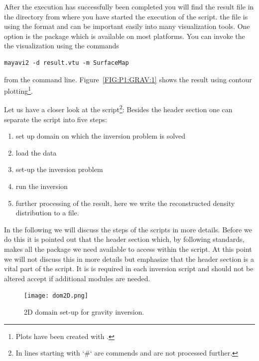 After the execution has successfully been completed you will find the result file  in the directory
from where you have started the execution of the script. the file is using the \VTK format and can be important 
easily into many visualization tools. One option is the \mayavi package which is available on most platforms. You can invoke the
the visualization using the commands
\begin{verbatim}
mayavi2 -d result.vtu -m SurfaceMap
\end{verbatim}
from the command line. Figure~\ref{FIG:P1:GRAV:1} shows the result using contour plotting\footnote{Plots
have been created with \VisIt.}.

Let us have a closer look at the script\footnote{In \python lines starting with `\#` are commends and are not processed further.}: Besides the header section one can separate the script into five steps:
\begin{enumerate}
 \item set up domain on which the inversion problem is solved
 \item load the data 
\item set-up the inversion problem
\item run the inversion
\item further processing of the result, here we write the reconstructed density distribution to a file.
\end{enumerate}
In the following we will discuss the steps of the scripts in more details. Before we do this it is pointed out that
the header section which, by following \python standards, makes all the package we need available to access within the script. At this
point we will not discuss this in more details but emphasize that the header section is a vital part of the script. It is is required 
in each \downunder inversion script and should not be altered accept if additional modules are needed. 

\begin{figure}
\centering
\texttt{[image: dom2D.png]}
\caption{2D domain set-up for gravity inversion.}
\label{FIG:P1:GRAV:2}
\end{figure}

